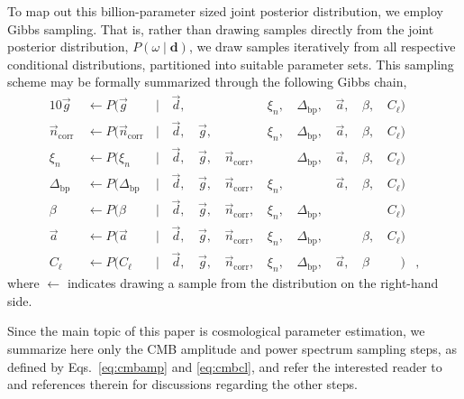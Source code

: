 \documentclass[twocolumn]{aa}
\renewcommand{\d}[0]{\vec{d}}
\newcommand{\n}[0]{\vec{n}}
\renewcommand{\a}[0]{\vec{a}}
\newcommand{\g}[0]{\vec{g}}
\newcommand{\Dbp}[0]{\Delta_{\mathrm{bp}}}
\begin{document}
To map out this billion-parameter sized joint posterior distribution,
we employ Gibbs sampling. That is, rather than drawing samples
directly from the joint posterior distribution, $P(\omega
\mid\mathbf{d})$, we draw samples iteratively from all respective
conditional distributions, partitioned into suitable parameter sets. This sampling scheme may be formally
summarized through the following Gibbs chain,
\begin{alignat}{10}
\g &\,\leftarrow P(\g&\,\mid &\,\d,&\, & &\,\xi_n, &\,\Dbp, &\,\a, &\,\beta, &\,C_{\ell})\\
\n_{\mathrm{corr}} &\,\leftarrow P(\n_{\mathrm{corr}}&\,\mid &\,\d, &\,\g, &\,&\,\xi_n,
&\,\Dbp, &\,\a, &\,\beta, &\,C_{\ell})\\
\xi_n &\,\leftarrow P(\xi_n&\,\mid &\,\d, &\,\g, &\,\n_{\mathrm{corr}}, &\,
&\,\Dbp, &\,\a, &\,\beta, &\,C_{\ell})\\
\Dbp &\,\leftarrow P(\Dbp&\,\mid &\,\d, &\,\g, &\,\n_{\mathrm{corr}}, &\,\xi_n,
&\,&\,\a, &\,\beta, &\,C_{\ell})\\
\beta &\,\leftarrow P(\beta&\,\mid &\,\d, &\,\g, &\,\n_{\mathrm{corr}}, &\,\xi_n,
&\,\Dbp, & &\,&\,C_{\ell})\\\label{eq:cmbamp}
\a &\,\leftarrow P(\a&\,\mid &\,\d, &\,\g, &\,\n_{\mathrm{corr}}, &\,\xi_n,
&\,\Dbp, &\,&\,\beta, &\,C_{\ell})\\\label{eq:cmbcl}
C_{\ell} &\,\leftarrow P(C_{\ell}&\,\mid &\,\d, &\,\g, &\,\n_{\mathrm{corr}}, &\,\xi_n,
&\,\Dbp, &\,\a, &\,\beta&\,\phantom{C_{\ell}})&,
\end{alignat}
where $\leftarrow$ indicates drawing a sample from the distribution on
the right-hand side.

Since the main topic of this paper is cosmological parameter
estimation, we summarize here only the CMB amplitude and power
spectrum sampling steps, as defined by Eqs.~\eqref{eq:cmbamp} and
\eqref{eq:cmbcl}, and refer the interested reader to \citet{bp01} and
references therein for discussions regarding the other steps.
\end{document}
